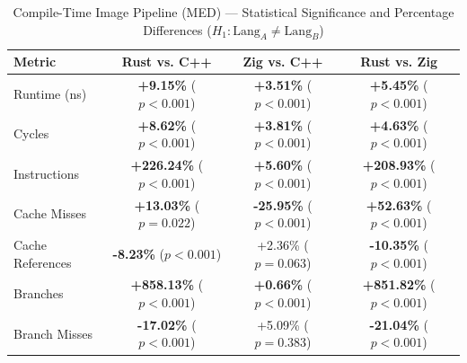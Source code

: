 \begin{table}[htbp]
\centering
\caption{Compile-Time Image Pipeline (MED) --- Statistical Significance and Percentage Differences ($H_1: \text{Lang}_A \neq \text{Lang}_B$)}
\label{tab:image_pipeline_comptime_MED_true_false_true}
\begin{tabular}{l ccc}
\toprule
\textbf{Metric} & \textbf{Rust vs. C++} & \textbf{Zig vs. C++} & \textbf{Rust vs. Zig} \\
\midrule
Runtime (ns) & \textbf{+9.15\%} ($p < 0.001$) & \textbf{+3.51\%} ($p < 0.001$) & \textbf{+5.45\%} ($p < 0.001$) \\
Cycles & \textbf{+8.62\%} ($p < 0.001$) & \textbf{+3.81\%} ($p < 0.001$) & \textbf{+4.63\%} ($p < 0.001$) \\
Instructions & \textbf{+226.24\%} ($p < 0.001$) & \textbf{+5.60\%} ($p < 0.001$) & \textbf{+208.93\%} ($p < 0.001$) \\
Cache Misses & \textbf{+13.03\%} ($p = 0.022$) & \textbf{-25.95\%} ($p < 0.001$) & \textbf{+52.63\%} ($p < 0.001$) \\
Cache References & \textbf{-8.23\%} ($p < 0.001$) & +2.36\% ($p = 0.063$) & \textbf{-10.35\%} ($p < 0.001$) \\
Branches & \textbf{+858.13\%} ($p < 0.001$) & \textbf{+0.66\%} ($p < 0.001$) & \textbf{+851.82\%} ($p < 0.001$) \\
Branch Misses & \textbf{-17.02\%} ($p < 0.001$) & +5.09\% ($p = 0.383$) & \textbf{-21.04\%} ($p < 0.001$) \\
\bottomrule
\end{tabular}
\end{table}


